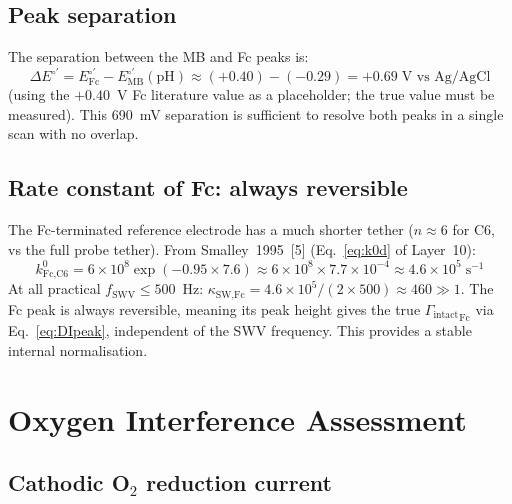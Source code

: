 \documentclass[10pt,a4paper]{article}
\numberwithin{equation}{section}
\newcommand{\cit}[1]{[#1]}
\newcommand{\Eo}{E^{\circ\prime}}
\newcommand{\Gtot}{\Gamma_{\text{intact}}}
\begin{document}
\subsection{Peak separation}

The separation between the MB and Fc peaks is:
\begin{equation}
  \Delta\Eo = \Eo_{\text{Fc}} - \Eo_{\text{MB}}(\text{pH})
  \approx (+0.40) - (-0.29) = +0.69\;\text{V vs Ag/AgCl}
  \label{eq:deltaEo}
\end{equation}
(using the $+0.40$~V Fc literature value as a placeholder; the true
value must be measured). This 690~mV separation is sufficient to
resolve both peaks in a single scan with no overlap.

\subsection{Rate constant of Fc: always reversible}

The Fc-terminated reference electrode has a much shorter tether
($n \approx 6$ for C6, vs the full probe tether). From Smalley~1995~\cit{5}
(Eq.~\ref{eq:k0d} of Layer~10):
\begin{equation}
  k^0_{\text{Fc,C6}} = 6\times10^8 \exp(-0.95 \times 7.6) \approx 6\times10^8 \times
  7.7\times10^{-4} \approx 4.6\times10^5\;\text{s}^{-1}
  \label{eq:k0FcC6}
\end{equation}
At all practical $f_{\text{SWV}} \leq 500$~Hz:
$\kappa_{\text{SW,Fc}} = 4.6\times10^5 / (2\times500) \approx 460 \gg 1$.
The Fc peak is always reversible, meaning its peak height gives the
true ${\Gtot}_{\text{Fc}}$ via Eq.~\eqref{eq:DIpeak}, independent of
the SWV frequency. This provides a stable internal normalisation.

\section{Oxygen Interference Assessment}
\label{sec:o2}

\subsection{Cathodic O$_2$ reduction current}
\end{document}
